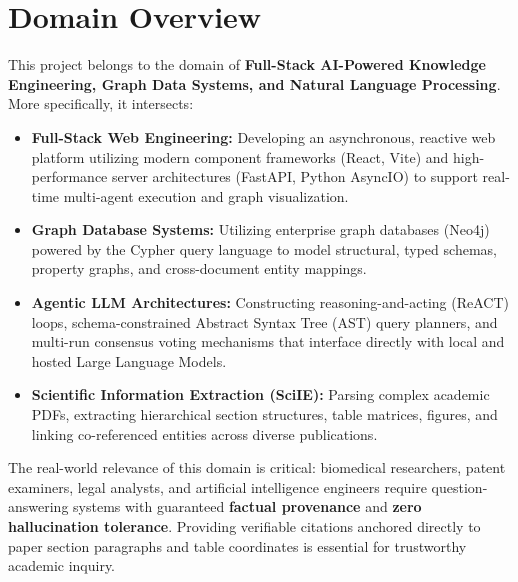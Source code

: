 \documentclass[12pt,a4paper,oneside]{report}
\begin{document}
\section{Domain Overview}
This project belongs to the domain of \textbf{Full-Stack AI-Powered Knowledge Engineering, Graph Data Systems, and Natural Language Processing}. More specifically, it intersects:
\begin{itemize}
    \item \textbf{Full-Stack Web Engineering:} Developing an asynchronous, reactive web platform utilizing modern component frameworks (React, Vite) and high-performance server architectures (FastAPI, Python AsyncIO) to support real-time multi-agent execution and graph visualization.
    \item \textbf{Graph Database Systems:} Utilizing enterprise graph databases (Neo4j) powered by the Cypher query language to model structural, typed schemas, property graphs, and cross-document entity mappings.
    \item \textbf{Agentic LLM Architectures:} Constructing reasoning-and-acting (ReACT) loops, schema-constrained Abstract Syntax Tree (AST) query planners, and multi-run consensus voting mechanisms that interface directly with local and hosted Large Language Models.
    \item \textbf{Scientific Information Extraction (SciIE):} Parsing complex academic PDFs, extracting hierarchical section structures, table matrices, figures, and linking co-referenced entities across diverse publications.
\end{itemize}

The real-world relevance of this domain is critical: biomedical researchers, patent examiners, legal analysts, and artificial intelligence engineers require question-answering systems with guaranteed \textbf{factual provenance} and \textbf{zero hallucination tolerance}. Providing verifiable citations anchored directly to paper section paragraphs and table coordinates is essential for trustworthy academic inquiry.
\end{document}
